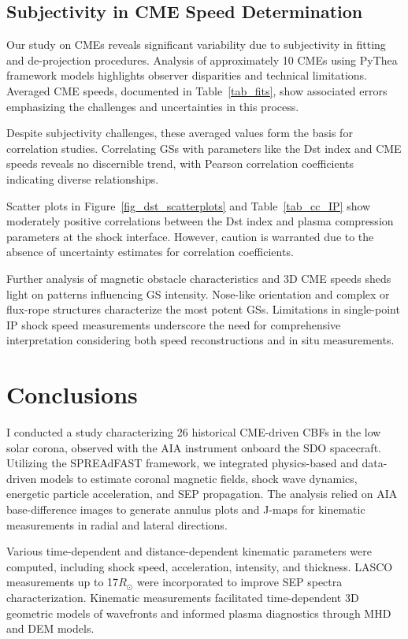 \subsection{Subjectivity in CME Speed Determination}
Our study on CMEs reveals significant variability due to subjectivity in fitting and de-projection procedures. Analysis of approximately 10 CMEs using PyThea framework models highlights observer disparities and technical limitations. Averaged CME speeds, documented in Table~\ref{tab_fits}, show associated errors emphasizing the challenges and uncertainties in this process.

Despite subjectivity challenges, these averaged values form the basis for correlation studies. Correlating GSs with parameters like the Dst index and CME speeds reveals no discernible trend, with Pearson correlation coefficients indicating diverse relationships.

Scatter plots in Figure~\ref{fig_dst_scatterplots} and Table~\ref{tab_cc_IP} show moderately positive correlations between the Dst index and plasma compression parameters at the shock interface. However, caution is warranted due to the absence of uncertainty estimates for correlation coefficients.

Further analysis of magnetic obstacle characteristics and 3D CME speeds sheds light on patterns influencing GS intensity. Nose-like orientation and complex or flux-rope structures characterize the most potent GSs. Limitations in single-point IP shock speed measurements underscore the need for comprehensive interpretation considering both speed reconstructions and in situ measurements.

\section{Conclusions}
I conducted a study characterizing 26 historical CME-driven CBFs in the low solar corona, observed with the AIA instrument onboard the SDO spacecraft. Utilizing the SPREAdFAST framework, we integrated physics-based and data-driven models to estimate coronal magnetic fields, shock wave dynamics, energetic particle acceleration, and SEP propagation. The analysis relied on AIA base-difference images to generate annulus plots and J-maps for kinematic measurements in radial and lateral directions.

Various time-dependent and distance-dependent kinematic parameters were computed, including shock speed, acceleration, intensity, and thickness. LASCO measurements up to 17$R_{\odot}$ were incorporated to improve SEP spectra characterization. Kinematic measurements facilitated time-dependent 3D geometric models of wavefronts and informed plasma diagnostics through MHD and DEM models.

